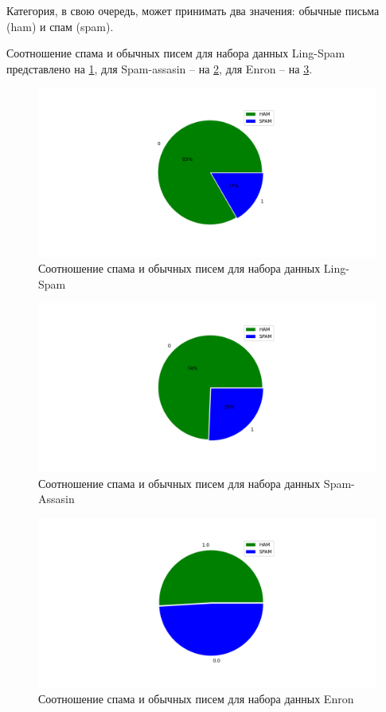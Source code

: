 Категория, в свою очередь, может принимать два значения: обычные письма (ham) и спам (spam).

Соотношение спама и обычных писем для набора данных Ling-Spam представлено на \ref{LingSpamScheme},
для Spam-assasin -- на \ref{SpamAssasinScheme}, для Enron -- на \ref{EnronScheme}.

\begin{figure}[H]
    \centering
    \includegraphics[width=150mm]{ling_spam.png}
    \caption{Соотношение спама и обычных писем для набора данных Ling-Spam}
    \label{LingSpamScheme}
\end{figure}

\begin{figure}[H]
    \centering
    \includegraphics[width=150mm]{spam_assasin.png}
    \caption{Соотношение спама и обычных писем для набора данных Spam-Assasin}
    \label{SpamAssasinScheme}
\end{figure}

\begin{figure}[H]
    \centering
    \includegraphics[width=150mm]{enron.png}
    \caption{Соотношение спама и обычных писем для набора данных Enron}
    \label{EnronScheme}
\end{figure}



